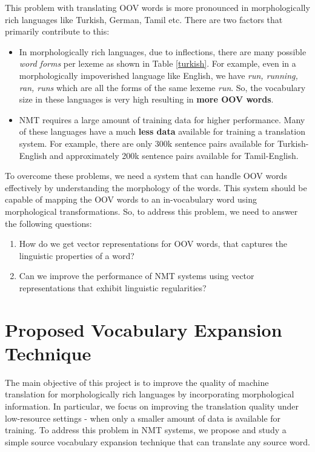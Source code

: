 This problem with translating OOV words is more pronounced in morphologically rich languages like Turkish, German, Tamil etc. There are two factors that primarily contribute to this:
\begin{itemize}
	\item In morphologically rich languages, due to inflections, there are many possible \textit{word forms} per lexeme as shown in Table \ref{turkish}. For example, even in a morphologically impoverished language like English, we have \textit{run, running, ran, runs} which are all the forms of the same lexeme \textit{run}. So, the vocabulary size in these languages is very high resulting in \textbf{more OOV words}. 
	
	\item NMT requires a large amount of training data for higher performance. Many of these languages have a much  \textbf{less data} available for training a translation system. For example, there are only 300k sentence pairs available for Turkish-English and approximately 200k sentence pairs available for Tamil-English. 
\end{itemize}

To overcome these problems, we need a system that can handle OOV words effectively by understanding the morphology of the words. This system should be capable of mapping the OOV words to an in-vocabulary word using morphological transformations. So, to address this problem, we need to answer the following questions:

\begin{enumerate}
	\item How do we get vector representations for OOV words, that captures the linguistic properties of a word?
	\item Can we improve the performance of NMT systems using vector representations that exhibit linguistic regularities?
\end{enumerate}



\section{Proposed Vocabulary Expansion Technique}
\label{sec:propose}
The main objective of this project is to improve the quality of machine translation for morphologically rich languages by incorporating morphological information. In particular, we focus on improving the translation quality under low-resource settings - when only a smaller amount of data is available for training. To address this problem in NMT systems, we propose and study a simple source vocabulary expansion technique that can translate any source word. 

